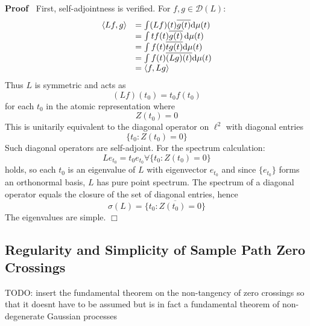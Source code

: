 \documentclass{article}
\newcommand{\mathd}{\mathrm{d}}
\newenvironment{proof}{\noindent\textbf{Proof\ }}{\hspace*{\fill}$\Box$\medskip}
\begin{document}
\begin{proof}
  First, self-adjointness is verified. For $f, g \in \mathcal{D} (L)$:
  \begin{equation}
    \begin{array}{ll}
      \langle Lf, g \rangle & = \int (Lf) (t) \overline{g (t)} \mathd \mu
      (t)\\
      & = \int tf (t) \overline{g (t)} \hspace{0.17em} \mathd \mu (t)\\
      & = \int f (t) \overline{tg (t)} \mathd \mu (t)\\
      & = \int f (t) \overline{(Lg) (t)} \mathd \mu (t)\\
      & = \langle f, Lg \rangle
    \end{array}
  \end{equation}
  Thus $L$ is symmetric and acts as
  \begin{equation}
    (Lf) (t_0) = t_0 f (t_0)
  \end{equation}
  for each $t_0$ in the atomic representation where
  \begin{equation}
    Z (t_0) = 0
  \end{equation}
  This is unitarily equivalent to the diagonal operator on $\ell^2$ with
  diagonal entries
  \begin{equation}
    \{t_0 : Z (t_0) = 0\}
  \end{equation}
  Such diagonal operators are self-adjoint. For the spectrum calculation:
  \begin{equation}
    Le_{t_0} = t_0 e_{t_0} \forall \{t_0 : Z (t_0) = 0\}
  \end{equation}
  holds, so each $t_0$ is an eigenvalue of $L$ with eigenvector $e_{t_0}$ and
  since $\{e_{t_0} \}$ forms an orthonormal basis, $L$ has pure point
  spectrum. The spectrum of a diagonal operator equals the closure of the set
  of diagonal entries, hence
  \begin{equation}
    \sigma (L) = \overline{\{t_0 : Z (t_0) = 0\}}
  \end{equation}
  The eigenvalues are simple.
\end{proof}

\subsection{Regularity and Simplicity of Sample Path Zero Crossings}

TODO: insert the fundamental theorem on the non-tangency of zero crossings so
that it doesnt have to be assumed but is in fact a fundamental theorem of
non-degenerate Gaussian processes
\end{document}
